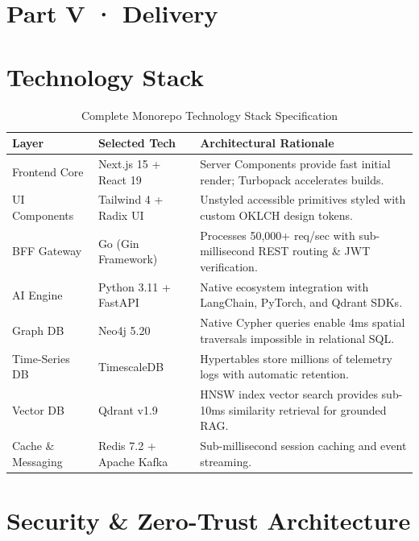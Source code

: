 \documentclass[11pt,a4paper]{article}
\begin{document}
\newpage
\section*{Part V · Delivery}

\section{Technology Stack}
\begin{table}[htbp]
\centering
\caption{Complete Monorepo Technology Stack Specification}
\begin{tabularx}{\textwidth}{
>{\raggedright\arraybackslash}p{}
>{\raggedright\arraybackslash}p{}
>{\raggedright\arraybackslash}X
}
\toprule
\textbf{Layer} & \textbf{Selected Tech} & \textbf{Architectural Rationale} \\
\midrule
Frontend Core & Next.js 15 + React 19 & Server Components provide fast initial render; Turbopack accelerates builds. \\
UI Components & Tailwind 4 + Radix UI & Unstyled accessible primitives styled with custom OKLCH design tokens. \\
BFF Gateway & Go (Gin Framework) & Processes 50,000+ req/sec with sub-millisecond REST routing \& JWT verification. \\
AI Engine & Python 3.11 + FastAPI & Native ecosystem integration with LangChain, PyTorch, and Qdrant SDKs. \\
Graph DB & Neo4j 5.20 & Native Cypher queries enable 4ms spatial traversals impossible in relational SQL. \\
Time-Series DB & TimescaleDB & Hypertables store millions of telemetry logs with automatic retention. \\
Vector DB & Qdrant v1.9 & HNSW index vector search provides sub-10ms similarity retrieval for grounded RAG. \\
Cache \& Messaging & Redis 7.2 + Apache Kafka & Sub-millisecond session caching and event streaming. \\
\bottomrule
\end{tabularx}
\end{table}

\section{Security \& Zero-Trust Architecture}
\end{document}
